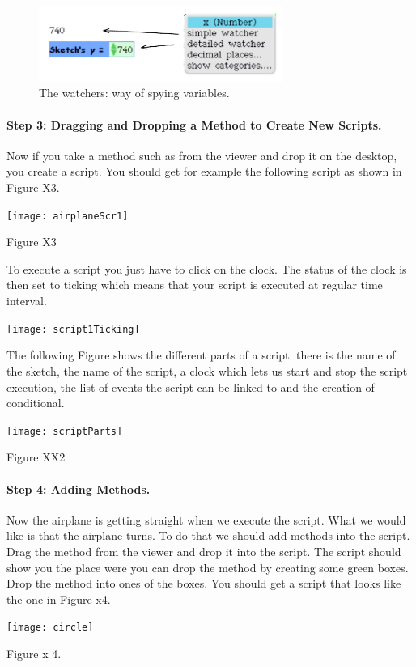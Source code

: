 \begin{figure}[h]
\begin{center}\includegraphics[width=8cm]{watchers}\end{center}
\caption{The watchers: way of spying variables. \label{fig:x2}}
\end{figure}


\paragraph{Step 3: Dragging  and Dropping a Method to Create New Scripts.}
Now if you take a method such as  from the viewer and drop it on the desktop, you create a script. You should get for example the following script as shown in Figure X3. 

\begin{center}\texttt{[image: airplaneScr1]}\end{center}
Figure X3

To execute a script you just have to click on the clock. The status of the clock is then set to ticking which means that your script is executed at regular time interval. 

\begin{center}\texttt{[image: script1Ticking]}\end{center}

The following Figure shows the different parts of a script: there is the name of the sketch, the name of the script, a clock which lets us start and stop the script execution, the list of events the script can be linked to and the creation of conditional. 

\begin{center}\texttt{[image: scriptParts]}\end{center}
Figure XX2


\paragraph{Step 4: Adding  Methods.} Now the airplane is getting straight when we execute the script. What we would like is that the airplane turns. To do that we should add methods into the script. Drag the method  from the viewer and drop it into the script. The script should show you the place were you can drop the method by creating some green boxes. Drop the method into ones of the boxes. You should get a script that looks like the one in Figure x4. 
\begin{center}\texttt{[image: circle]}\end{center}
Figure x 4.


